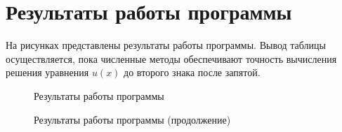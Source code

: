 \section{Результаты работы программы}
На рисунках представлены результаты работы программы. Вывод таблицы осуществляется, пока численные методы обеспечивают точность вычисления решения уравнения $u(x)$ до второго знака после запятой.
\begin{figure}[h!]
\caption{Результаты работы программы}
\end{figure}
\begin{figure}[h!]
\caption{Результаты работы программы (продолжение)}
\label{ris:image}
\end{figure}
